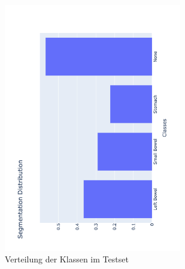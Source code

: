 \begin{figure}[htb]
	\begin{center}
		\includegraphics[width=220pt , angle=270]{bilder/segmentation_distribution}
		\caption{Verteilung der Klassen im Testset}\label{Fig:klassenverteilung}
	\end{center}
\end{figure}


